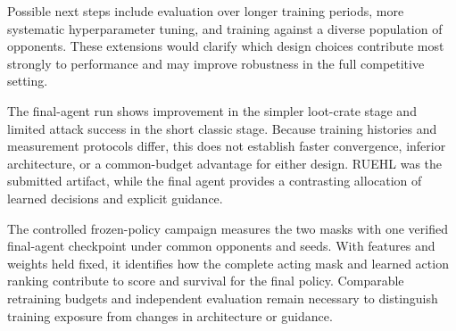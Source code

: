 \documentclass[11pt,a4paper]{article}
\begin{document}
Possible next steps include evaluation over longer training periods, more systematic hyperparameter tuning, and training against a diverse population of opponents. These extensions would clarify which design choices contribute most strongly to performance and may improve robustness in the full competitive setting.

The final-agent run shows improvement in the simpler loot-crate stage and limited attack success in the short classic stage. Because training histories and measurement protocols differ, this does not establish faster convergence, inferior architecture, or a common-budget advantage for either design. RUEHL was the submitted artifact, while the final agent provides a contrasting allocation of learned decisions and explicit guidance.

The controlled frozen-policy campaign measures the two masks with one verified final-agent checkpoint under common opponents and seeds. With features and weights held fixed, it identifies how the complete acting mask and learned action ranking contribute to score and survival for the final policy. Comparable retraining budgets and independent evaluation remain necessary to distinguish training exposure from changes in architecture or guidance.


\FloatBarrier


\begingroup\let\section\subsection\let\subsection\subsubsection
\endgroup
\FloatBarrier
\clearpage


\end{document}
